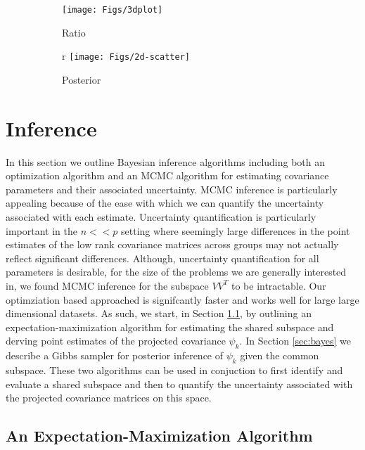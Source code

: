 \documentclass{article}
\begin{document}
\begin{figure}[t]
    \centering
    \begin{subfigure}[b]{0.25\textwidth}
        \texttt{[image: Figs/3dplot]}
        \caption{Ratio}
        \label{fig:dmelanRatio}
    \end{subfigure}
    \qquad     \qquad     \qquad 
    \begin{subfigure}[b]{0.25\textwidth}r
        \texttt{[image: Figs/2d-scatter]}
        \caption{Posterior}
        \label{fig:dmelanPosterior}
    \end{subfigure}
    \caption{ }
\end{figure}


\section{Inference}

In this section we outline Bayesian inference algorithms including
both an optimization algorithm and an MCMC algorithm for estimating
covariance parameters and their associated uncertainty.  MCMC
inference is particularly appealing because of the ease with which we
can quantify the uncertainty associated with each estimate.
Uncertainty quantification is particularly important in the $n << p$
setting where seemingly large differences in the point estimates of
the low rank covariance matrices across groups may not actually
reflect significant differences.  Although, uncertainty quantification
for all parameters is desirable, for the size of the problems we are
generally interested in, we found MCMC inference for the subspace
$VV^T$ to be intractable.  Our optimziation based approached is
signifcantly faster and works well for large large dimensional
datasets.  As such, we start, in Section \ref{sec:em}, by outlining an
expectation-maximization algorithm for estimating the shared subspace
and derving point estimates of the projected covariance $\psi_k$. In
Section \ref{sec:bayes} we describe a Gibbs sampler for posterior
inference of $\psi_k$ given the common subspace.  These two algorithms
can be used in conjuction to first identify and evaluate a shared
subspace and then to quantify the uncertainty associated with the
projected covariance matrices on this space.

\subsection{An Expectation-Maximization Algorithm}
\label{sec:em}
\end{document}
